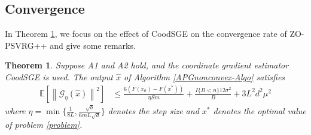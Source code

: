 \documentclass{article}
\newcommand*{\G}{\mathcal{G}}
\newcommand*{\E}{\mathbb{E}}
\newcommand{\norm}[1]{\left\lVert#1\right\rVert}
\newtheorem{theorem}{Theorem}[section]
\theoremstyle{definition}
\theoremstyle{remark}
\begin{document}
\subsection{Convergence}
In Theorem \ref{noncon-zoo}, we focus on the effect of CoodSGE on the convergence rate of ZO-PSVRG++ and give some remarks.

\begin{theorem}\label{noncon-zoo}
Suppose A1 and A2 hold, and the coordinate gradient estimator CoodSGE is used. The output $\hat{x}$ of Algorithm \ref{APGnonconvex-Algo} satisfies
  \begin{equation}\label{noncon-zoo-main}
  \begin{split}
\E[\norm{\G_{\eta}(\hat{x})}^2] & \leq \frac{6\left(F(x_0) - F({x}^*)\right)}{\eta Sm} + \frac{I\{B < n\}12\sigma ^2}{B}+3{L^2 d^2 \mu^2}
\end{split}
 \end{equation}
where $\eta = \min\{\frac{1}{8L}, \frac{\sqrt{b}}{6mL\sqrt{d}}\}$ denotes the step size and $x^*$ denotes the optimal value of problem \ref{problem}.
\end{theorem}
\end{document}
